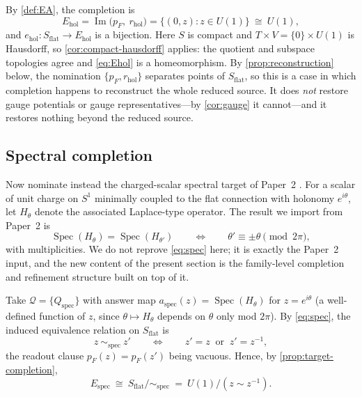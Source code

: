 \documentclass[11pt,reqno]{amsart}
\theoremstyle{plain}
\theoremstyle{definition}
\theoremstyle{remark}
\numberwithin{equation}{section}
\DeclareMathOperator{\Image}{Im}
\DeclareMathOperator{\Spec}{Spec}
\begin{document}
By \cref{def:EA}, the completion is
\begin{equation}
\label{eq:Ehol}
E_{\mathrm{hol}}
=\Image\bigl(p_F,\ r_{\mathrm{hol}}\bigr)
=\{(0,z):z\in U(1)\}
\ \cong\ U(1),
\end{equation}
and $e_{\mathrm{hol}}\colon S_{\mathrm{flat}}\to E_{\mathrm{hol}}$ is a bijection. Here $S$ is compact
and $T\times V=\{0\}\times U(1)$ is Hausdorff, so \cref{cor:compact-hausdorff} applies: the quotient
and subspace topologies agree and \eqref{eq:Ehol} is a homeomorphism. By
\cref{prop:reconstruction} below, the nomination $\{p_F,r_{\mathrm{hol}}\}$ separates points of
$S_{\mathrm{flat}}$, so this is a case in which completion happens to reconstruct the whole reduced
source. It does \emph{not} restore gauge potentials or gauge representatives---by \cref{cor:gauge} it
cannot---and it restores nothing beyond the reduced source.

\subsection{Spectral completion}

Now nominate instead the charged-scalar spectral target of Paper~2 \cite{Paper2}. For a scalar of
unit charge on $S^1$ minimally coupled to the flat connection with holonomy $e^{i\theta}$, let
$H_\theta$ denote the associated Laplace-type operator. The result we import from Paper~2 is
\begin{equation}
\label{eq:spec}
\Spec(H_\theta)=\Spec(H_{\theta'})
\qquad\Longleftrightarrow\qquad
\theta'\equiv\pm\theta \pmod{2\pi},
\end{equation}
with multiplicities. We do not reprove \eqref{eq:spec} here; it is exactly the Paper~2 input, and
the new content of the present section is the family-level completion and refinement structure built
on top of it.

Take $\mathcal Q=\{Q_{\mathrm{spec}}\}$ with answer map
$a_{\mathrm{spec}}(z)=\Spec(H_\theta)$ for $z=e^{i\theta}$ (a well-defined function of $z$, since
$\theta\mapsto H_\theta$ depends on $\theta$ only mod $2\pi$). By \eqref{eq:spec}, the induced
equivalence relation on $S_{\mathrm{flat}}$ is
\begin{equation}
\label{eq:inversion}
z\ \sim_{\mathrm{spec}}\ z'
\qquad\Longleftrightarrow\qquad
z'=z\ \text{ or }\ z'=z^{-1},
\end{equation}
the readout clause $p_F(z)=p_F(z')$ being vacuous. Hence, by \cref{prop:target-completion},
\begin{equation}
\label{eq:Espec-quotient}
E_{\mathrm{spec}}\ \cong\ S_{\mathrm{flat}}/\!\sim_{\mathrm{spec}}\ =\ U(1)/(z\sim z^{-1}).
\end{equation}
\end{document}
